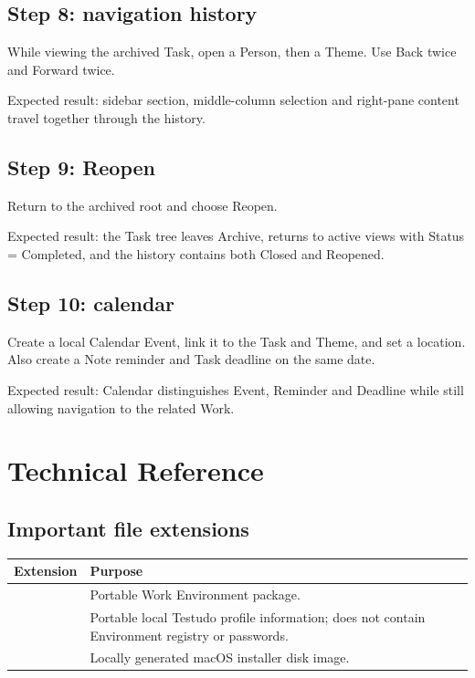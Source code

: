 \documentclass{testudomanual}
\begin{document}
\section{Step 8: navigation history}

While viewing the archived Task, open a Person, then a Theme. Use Back twice and Forward twice.

Expected result: sidebar section, middle-column selection and right-pane content travel together through the history.

\section{Step 9: Reopen}

Return to the archived root and choose Reopen.

Expected result: the Task tree leaves Archive, returns to active views with Status = Completed, and the history contains both Closed and Reopened.

\section{Step 10: calendar}

Create a local Calendar Event, link it to the Task and Theme, and set a location. Also create a Note reminder and Task deadline on the same date.

Expected result: Calendar distinguishes Event, Reminder and Deadline while still allowing navigation to the related Work.


\chapter{Technical Reference}

\section{Important file extensions}

\begin{longtable}{L{0.28\textwidth} L{0.62\textwidth}}
\toprule
\textbf{Extension} & \textbf{Purpose} \\
\midrule
\endhead
{} & Portable Work Environment package. \\
 & Portable local Testudo profile information; does not contain Environment registry or passwords. \\
 & Locally generated macOS installer disk image. \\
\bottomrule
\end{longtable}
\end{document}
